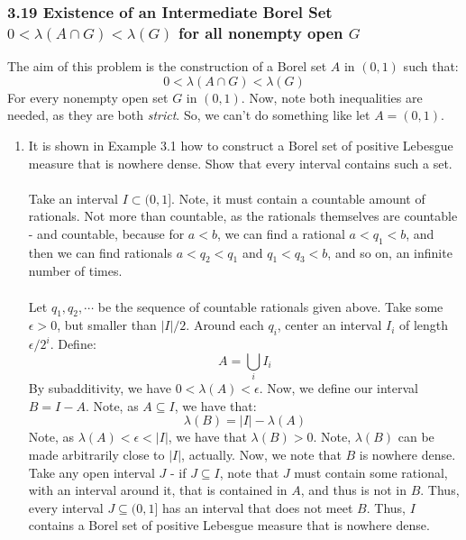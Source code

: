 \documentclass[12pt,a4paper]{article}
\newcommand{\1}[1]{\mathbbm{1}\left\{ #1 \right\}}
\begin{document}
\subsubsection{3.19 Existence of an Intermediate Borel Set $0 < \lambda(A \cap G) < \lambda(G)$ for all nonempty open $G$} The aim of this problem is the construction of a Borel set $A$ in $(0,1)$ such that:
$$
	0 < \lambda(A \cap G) < \lambda(G)
$$
For every nonempty open set $G$ in $(0,1)$. Now, note both inequalities are needed, as they are both \textit{strict}. So, we can't do something like let $A = (0,1)$.

\begin{enumerate}
	\item It is shown in Example 3.1 how to construct a Borel set of positive Lebesgue measure that is nowhere dense. Show that every interval contains such a set.
	\\\\
	Take an interval $I \subset (0,1]$. Note, it must contain a countable amount of rationals. Not more than countable, as the rationals themselves are countable - and countable, because for $a < b$, we can find a rational $a < q_1 < b$, and then we can find rationals $a < q_2 < q_1$ and $q_1 < q_3 < b$, and so on, an infinite number of times.
	\\\\
	Let $q_1, q_2, \cdots$ be the sequence of countable rationals given above. Take some $\epsilon > 0$, but smaller than $|I|/2$. Around each $q_i$, center an interval $I_i$ of length $\epsilon/2^i$. Define:
	$$
		A = \bigcup_i I_i
	$$
	By subadditivity, we have $0 < \lambda(A) < \epsilon$. Now, we define our interval $B = I - A$. Note, as $A \subseteq I$, we have that:
	$$
		\lambda(B) = |I| - \lambda(A)
	$$
	Note, as $\lambda(A) < \epsilon < |I|$, we have that $\lambda(B) > 0$. Note, $\lambda(B)$ can be made arbitrarily close to $|I|$, actually. Now, we note that $B$ is nowhere dense. Take any open interval $J$ - if $J \subseteq I$, note that $J$ must contain some rational, with an interval around it, that is contained in $A$, and thus is not in $B$. Thus, every interval $J \subseteq (0,1]$ has an interval that does not meet $B$. Thus, $I$ contains a Borel set of positive Lebesgue measure that is nowhere dense.
	

\end{enumerate}
\end{document}
